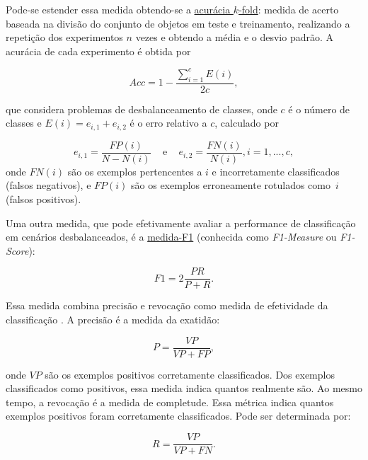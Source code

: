 Pode-se estender essa medida obtendo-se a \underline{acurácia $k$-fold}: medida de acerto baseada na divisão do conjunto de objetos em teste e treinamento, realizando a repetição dos experimentos $n$ vezes e obtendo a média e o desvio padrão. A acurácia de cada experimento é obtida por

    \begin{equation*}
      Acc = 1 - \frac{\sum_{i=1}^{c} E(i)}{2c},
    \label{eq:Accuracy}
    \end{equation*}

    \noindent  que considera problemas de desbalanceamento de classes, onde $c$ é o número de classes e $E(i) = e_{i,1} + e_{i,2}$ é o erro relativo a $c$, calculado por

    \begin{equation*}
      e_{i,1} = \frac{FP(i)}{N-N(i)} \,\,\,\,\, \text{ e } \,\,\,\,\, e_{i,2} = \frac{FN(i)}{N(i)}, i=1,...,c,
    \label{eq:Errors}
    \end{equation*}
   \noindent onde $FN(i)$ são os exemplos pertencentes a $i$ e incorretamente classificados (falsos negativos), e $FP(i)$ são os exemplos erroneamente rotulados como~$i$ (falsos positivos).


Uma outra medida, que pode efetivamente avaliar a performance de classificação em cenários desbalanceados, é a \underline{medida-F1} (conhecida como \textit{F1-Measure} ou \textit{F1-Score}):

\begin{equation*}
  F1 = 2 \frac{PR}{P+R}.
\end{equation*}

Essa medida combina precisão e revocação como medida de efetividade da classificação \cite{Garcia2009}. A precisão é a medida da exatidão:

\begin{equation*}
  P = \frac{VP}{VP + FP},
\end{equation*}

\noindent onde $VP$ são os exemplos positivos corretamente classificados. Dos exemplos classificados como positivos, essa medida indica quantos realmente são. Ao mesmo tempo, a revocação é a medida de completude. Essa métrica indica quantos exemplos positivos foram corretamente classificados. Pode ser determinada por:

\begin{equation*}
  R = \frac{VP}{VP + FN}.
\end{equation*}

